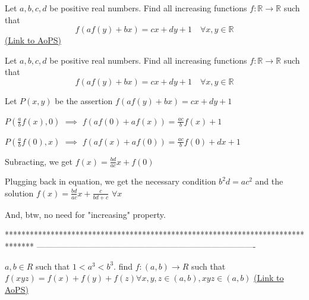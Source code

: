 \begin{problem}
	Let $a,b,c,d$ be positive real numbers. Find all increasing functions $f:\mathbb{R}\to\mathbb{R}$ such that
\[f(af(y)+bx)=cx+dy+1 \quad \forall x,y\in\mathbb{R}\]
	\flushright \href{https://artofproblemsolving.com/community/c6h568168}{(Link to AoPS)}
\end{problem}



\begin{solution}
	\begin{tcolorbox}Let $a,b,c,d$ be positive real numbers. Find all increasing functions $f:\mathbb{R}\to\mathbb{R}$ such that
\[f(af(y)+bx)=cx+dy+1 \quad \forall x,y\in\mathbb{R}\]\end{tcolorbox}
Let $P(x,y)$ be the assertion $f(af(y)+bx)=cx+dy+1$

$P(\frac abf(x),0)$ $\implies$ $f(af(0)+af(x))=\frac{ac}bf(x)+1$

$P(\frac abf(0),x)$ $\implies$ $f(af(x)+af(0))=\frac{ac}bf(0)+dx+1$

Subracting, we get $f(x)=\frac{bd}{ac}x+f(0)$

Plugging back in equation, we get the necessary condition $\boxed{b^2d=ac^2}$ and the solution $\boxed{f(x)=\frac{bd}{ac}x+\frac c{bd+c}}$ $\forall x$

And, btw, no need for "increasing" property.
\end{solution}
*******************************************************************************
-------------------------------------------------------------------------------

\begin{problem}
	$a,b \in R$ such that $1<a^3<b^3$. find $f:(a,b) \to R$ such that $f(xyz)=f(x)+f(y)+f(z) \forall x,y,z \in (a,b) ,xyz \in (a,b)$
	\flushright \href{https://artofproblemsolving.com/community/c6h568194}{(Link to AoPS)}
\end{problem}



